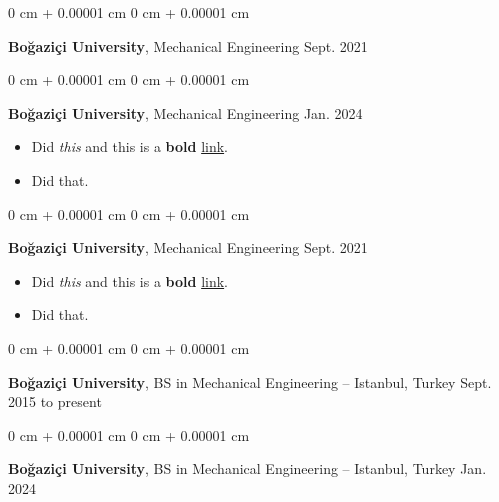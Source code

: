 \documentclass[10pt, letterpaper]{article}
\newenvironment{highlights}{
    \begin{itemize}[
        topsep=0.10 cm,
        parsep=0.10 cm,
        partopsep=0pt,
        itemsep=0pt,
        leftmargin=0 cm + 10pt
    ]
}{
    \end{itemize}
        
    \vspace{-0.20cm}
} %
\newenvironment{onecolentry}{
    \begin{adjustwidth}{
        0 cm + 0.00001 cm
    }{
        0 cm + 0.00001 cm
    }
}{
    \end{adjustwidth}
} %
\begin{document}
        \vspace{0.1 cm}

        \begin{onecolentry}
            \textbf{Boğaziçi University}, Mechanical Engineering \hfill Sept. 2021
        \end{onecolentry}

        \vspace{0.1 cm}

        \begin{onecolentry}
            \textbf{Boğaziçi University}, Mechanical Engineering \hfill Jan. 2024
            \begin{highlights}
                \item Did \textit{this} and this is a \textbf{bold} \href{https://example.com}{link}.
                \item Did that.
            \end{highlights}
        \end{onecolentry}

        \vspace{0.1 cm}

        \begin{onecolentry}
            \textbf{Boğaziçi University}, Mechanical Engineering \hfill Sept. 2021
            \begin{highlights}
                \item Did \textit{this} and this is a \textbf{bold} \href{https://example.com}{link}.
                \item Did that.
            \end{highlights}
        \end{onecolentry}

        \vspace{0.1 cm}

        \begin{onecolentry}
            \textbf{Boğaziçi University}, BS in Mechanical Engineering -- Istanbul, Turkey \hfill Sept. 2015 to present
        \end{onecolentry}

        \vspace{0.1 cm}

        \begin{onecolentry}
            \textbf{Boğaziçi University}, BS in Mechanical Engineering -- Istanbul, Turkey \hfill Jan. 2024
        \end{onecolentry}

        \vspace{0.1 cm}
\end{document}

